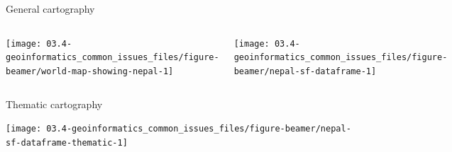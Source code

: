 \documentclass[11pt,dvipsnames,ignorenonframetext,aspectratio=169]{beamer}
\begin{document}
\begin{frame}{General cartography}
\protect\hypertarget{general-cartography}{}
\begin{columns}[T, onlytextwidth]


\texttt{[image: 03.4-geoinformatics\_common\_issues\_files/figure-beamer/world-map-showing-nepal-1]} 



\texttt{[image: 03.4-geoinformatics\_common\_issues\_files/figure-beamer/nepal-sf-dataframe-1]} 

\end{columns}
\end{frame}

\begin{frame}{Thematic cartography}
\protect\hypertarget{thematic-cartography}{}
\begin{center}\texttt{[image: 03.4-geoinformatics\_common\_issues\_files/figure-beamer/nepal-sf-dataframe-thematic-1]} \end{center}
\end{frame}
\end{document}
